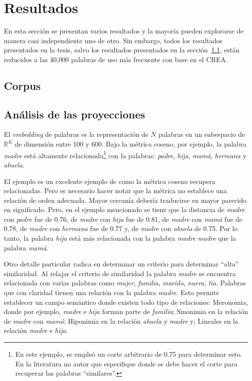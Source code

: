 \chapter{Resultados}
\label{ch:chap4}

En esta sección se presentan varios resultados y la mayoría pueden explorarse de manera casi independiente uno de otro. Sin embargo, todos los resultados presentados en la tesis, salvo los resultados presentados en la sección~\ref{sec:sec41}, están reducidos a las 40,000 palabras de uso más frecuente con base en el CREA.

\section{Corpus}
\label{sec:sec41}

\section{Análisis de las proyecciones}
El \textit{embedding} de palabras es la representación de $N$ palabras en un subespacio de $\mathbb{R}^K$ de dimensión entre 100 y 600. Bajo la métrica coseno, por ejemplo, la palabra \textit{madre} está altamente relacionada\footnote{En este ejemplo, se empleó un corte arbitrario de 0.75 para determinar esto. En la literatura no autor que especifique donde se debe hacer el corte para recuperar las palabras ``similares''.} con la palabras: \textit{padre}, \textit{hija}, \textit{mamá}, \textit{hermana} y \textit{abuela}. 

El ejemplo es un excelente ejemplo de como la métrica coseno recupera relacionadas. Pero es necesario hacer notar que la métrica no establece una relación de orden adecuada. Mayor cercanía debería traducirse en mayor parecido en significado. Pero, en el ejemplo mencionado se tiene que la distancia de \textit{madre} con \textit{padre} fue de 0.76, de \textit{madre} con \textit{hija} fue de 0.81, de \textit{madre} con \textit{mamá} fue de 0.78, de \textit{madre} con \textit{hermana} fue de 0.77 y, de \textit{madre} con \textit{abuela} de 0.75. Por lo tanto, la palabra \textit{hija} está más relacionada con la palabra \textit{madre} \textit{madre} que la palabra \textit{mamá}.

Otro detalle particular radica en determinar un criterio para determinar ``alta'' similaridad. Al relajar el criterio de similaridad la palabra \textit{madre} se encuentra relacionada con varias palabras como \textit{mujer}, \textit{familia}, \textit{marido}, \textit{nuera}, \textit{tía}. Palabras que con claridad tienen una relación con la palabra \textit{madre}. Esto permite establecer un campo semántico donde existen todo tipo de relaciones: Meronomia, donde por ejemplo, \textit{madre} e \textit{hija} forman parte de \textit{familia}; Sinonimia en la relación de \textit{madre} con \textit{mamá}; Hiponimia en la relación \textit{abuela} y \textit{madre} y; Lineales en la relación \textit{madre} e \textit{hija}.

